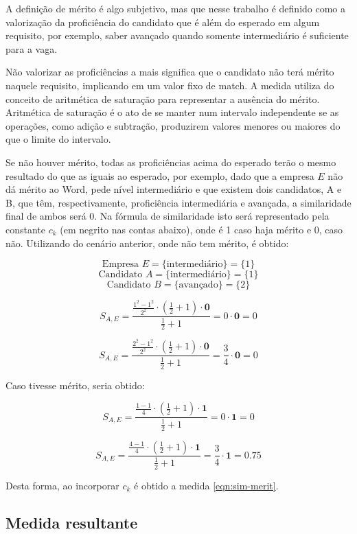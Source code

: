\documentclass[preprint,12pt]{elsarticle}
\begin{document}
A definição de mérito é algo subjetivo, mas que nesse trabalho é definido como a valorização da proficiência do candidato que é além do esperado em algum requisito, por exemplo, saber avançado quando somente intermediário é suficiente para a vaga. 

Não valorizar as proficiências a mais significa que o candidato não terá mérito naquele requisito, implicando em um valor fixo de match. A medida utiliza do conceito de  aritmética de saturação para representar a ausência do mérito. Aritmética de saturação é o ato de se manter num intervalo independente se as operações, como adição e subtração, produzirem valores menores ou maiores do que o limite do intervalo.

Se não houver mérito, todas as proficiências acima do esperado terão o mesmo resultado do que as iguais ao esperado, por exemplo, dado que a empresa $E$ não dá mérito ao Word, pede nível intermediário e que existem dois candidatos, A e B, que têm, respectivamente, proficiência intermediária e avançada, a similaridade final de ambos será 0. Na fórmula de similaridade isto será representado pela constante $c_{k}$ (em negrito nas contas abaixo), onde é 1 caso haja mérito e 0, caso não. Utilizando do cenário anterior, onde não tem mérito, é obtido:


$$ \text{Empresa } E = \{ \text{intermediário} \} = \{ 1 \} $$
$$ \text{Candidato } A = \{ \text{intermediário} \} = \{ 1 \} $$
$$ \text{Candidato } B = \{ \text{avançado} \} = \{ 2 \} $$


$$ S_{A,E} = \frac{\tfrac{1^2 - 1^2}{2^2} \cdot (\tfrac{1}{2} + 1) \cdot \textbf{0}}
                  {\tfrac{1}{2} + 1}
           = 0 \cdot \textbf{0} = 0 $$

$$ S_{A,E} = \frac{\tfrac{2^2 - 1^2}{2^2} \cdot (\tfrac{1}{2} + 1) \cdot \textbf{0}}
                  {\tfrac{1}{2} + 1}
           = \frac{3}{4} \cdot \textbf{0} = 0 $$

Caso tivesse mérito, seria obtido:

$$ S_{A,E} = \frac{\tfrac{1 - 1}{4} \cdot (\tfrac{1}{2} + 1) \cdot \textbf{1}}
                  {\tfrac{1}{2} + 1}
           = 0 \cdot \textbf{1} = 0 $$

$$ S_{A,E} = \frac{\tfrac{4 - 1}{4} \cdot (\tfrac{1}{2} + 1) \cdot \textbf{1}}
                  {\tfrac{1}{2} + 1}
           = \frac{3}{4} \cdot \textbf{1} = 0.75 $$
           
Desta forma, ao incorporar $c_{k}$ é obtido a medida \ref{eqn:sim-merit}.

\subsection{Medida resultante}
\end{document}

